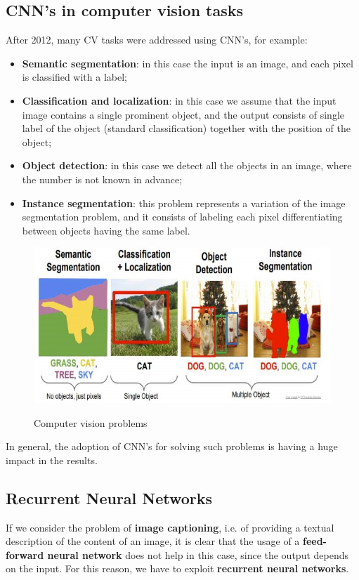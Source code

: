 \subsection{CNN's in computer vision tasks}
After 2012, many CV tasks were addressed using CNN's, for example:

\begin{itemize}
    \item \textbf{Semantic segmentation}: in this case the input is an image, and each pixel is classified with a label;
    \item \textbf{Classification and localization}: in this case we assume that the input image contains a single prominent object, and the output consists of single label of the object (standard classification) together with the position of the object;
    \item \textbf{Object detection}: in this case we detect all the objects in an image, where the number is not known in advance;
    \item \textbf{Instance segmentation}: this problem represents a variation of the image segmentation problem, and it consists of labeling each pixel differentiating between objects having the same label.
\end{itemize}

\begin{figure}[h!]
		\centering
        \includegraphics[scale = 1.5]{img/cv tasks.jpg}
		\label{mi}
        \caption{Computer vision problems}
\end{figure}

In general, the adoption of CNN's for solving such problems is having a huge impact in the results.

\subsection{Recurrent Neural Networks}
If we consider the problem of \textbf{image captioning}, i.e. of providing a textual description of the content of an image, it is clear that the usage of a \textbf{feed-forward neural network} does not help in this case, since the output depends on the input. For this reason, we have to exploit \textbf{recurrent neural networks}.

